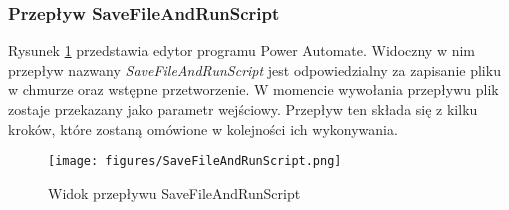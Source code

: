 


\subsubsection*{Przepływ SaveFileAndRunScript}
\label{childflow}
Rysunek \ref{fig:savefileandrunscript} przedstawia edytor programu Power Automate. Widoczny w nim przepływ nazwany \emph{SaveFileAndRunScript} jest odpowiedzialny za zapisanie pliku w chmurze oraz wstępne przetworzenie. W momencie wywołania przepływu plik zostaje przekazany jako parametr wejściowy. Przepływ ten składa się z kilku kroków, które zostaną omówione w kolejności ich wykonywania.

\begin{figure}[t]
    \centering
    \texttt{[image: figures/SaveFileAndRunScript.png]}
    \caption{Widok przepływu SaveFileAndRunScript}
    \label{fig:savefileandrunscript}
\end{figure}


